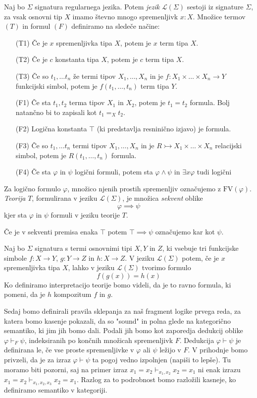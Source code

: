 \documentclass[../kategoricna_logika.tex]{subfiles}
\begin{document}
\begin{definicija}
  Naj bo $\Sigma$ signatura regularnega jezika. Potem \emph{jezik} $\mathcal{L}(\Sigma)$ sestoji iz signature $\Sigma$, za vsak osnovni tip $X$ imamo števno mnogo spremenljivk $x:X$. Množice termov $(T)$ in formul $(F)$ definiramo na sledeče načine:
  \begin{itemize}
    \item [(T1)] Če je $x$ spremenljivka tipa $X$, potem je $x$ term tipa $X$.
    \item [(T2)] Če je $c$ konstanta tipa $X$, potem je $c$ term tipa $X$.
    \item [(T3)] Če so $t_1, \ldots t_n$ že termi tipov $X_1, \ldots, X_n$ in je $f : X_1 \times \ldots \times X_n \to Y$ funkcijski simbol, potem je $f(t_1, \ldots, t_n)$ term tipa $Y$.
    \item [(F1)] Če sta $t_1, t_2$ terma tipov $X_1$ in $X_2$, potem je $t_1 = t_2$ formula. Bolj natančno bi to zapisali kot $t_1 =_X t_2$.
    \item [(F2)] Logična konstanta $\top$ (ki predstavlja resninično izjavo) je formula.
    \item [(F3)] Če so $t_1, \ldots t_n$ termi tipov $X_1, \ldots, X_n$ in je $R \rightarrowtail X_1 \times \ldots \times X_n$ relacijski simbol, potem je $R(t_1, \ldots, t_n)$ formula.
    \item [(F4)] Če sta $\varphi$ in $\psi$ logični formuli, potem sta $\varphi \wedge \psi$ in $\exists x \varphi$ tudi logični 
  \end{itemize}
  Za logično formulo $\varphi$, množico njenih prostih spremenljiv označujemo z $\mathrm{FV}(\varphi)$. \emph{Teorija} $T$, formulirana v jeziku $\mathcal{L}(\Sigma)$, je množica \emph{sekvent} oblike 
  $$\varphi \implies \psi$$
  kjer sta $\varphi$ in $\psi$ formuli v jeziku teorije $T$.
\end{definicija}
Če je v sekventi premisa enaka $\top$ potem $\top \implies \psi$ označujemo kar kot $\psi$.
\begin{primer}
  Naj bo $\Sigma$ signatura s termi osnovnimi tipi $X,Y$ in $Z$, ki vsebuje tri funkcijske simbole $f: X \to Y$, $g : Y \to Z$ in $h : X \to Z$. V jeziku $\mathcal{L}(\Sigma)$ potem, če je $x$ spremenljivka tipa $X$, lahko v jeziku $\mathcal{L}(\Sigma)$ tvorimo formulo
  $$f(g(x)) = h(x)$$
  Ko definiramo interpretacijo teorije bomo videli, da je to ravno formula, ki pomeni, da je $h$ kompozitum $f$ in $g$.
\end{primer}
Sedaj bomo definirali pravila sklepanja za naš fragment logike prvega reda, za katera bomo kasenje pokazali, da so "sound" in polna glede na kategorično semantiko, ki jim jih bomo dali.
Podali jih bomo kot zaporedja dedukcij oblike $\varphi \vdash_F \psi$, indeksiranih po končnih množicah spremenljivk $F$. Dedukcija $\varphi \vdash \psi$ je definirana le, če vse proste spremenljivke v $\varphi$ ali $\psi$ ležijo v $F$. V prihodnje bomo privzeli, da je za izraz $\varphi \vdash \psi$ ta pogoj vedno izpolnjen (napiši to lepše).
Tu moramo biti pozorni, saj na primer izraz $x_1 = x_2 \vdash_{x_1, x_2} x_2 = x_1$ ni enak izrazu $x_1 = x_2 \vdash_{x_1, x_2, x_3} x_2 = x_1$. Razlog za to podrobnost bomo razložili kasneje, ko definiramo semantiko v kategoriji.
\end{document}
